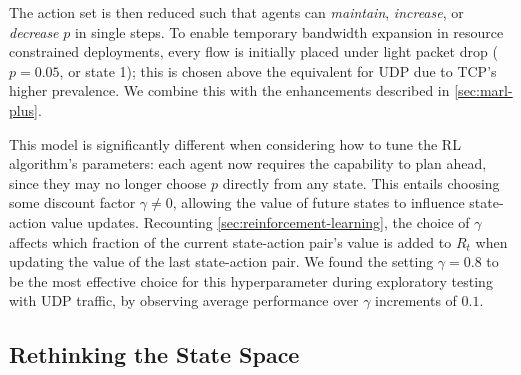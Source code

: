 \documentclass[conference, a4paper, 10pt, times]{IEEEtran}
\begin{document}
The action set is then reduced such that agents can \emph{maintain}, \emph{increase}, or \emph{decrease} $p$ in single steps.
To enable temporary bandwidth expansion in resource constrained deployments, every flow is initially placed under light packet drop ($p=0.05$, or state 1); this is chosen above the equivalent for UDP due to TCP's higher prevalence.
We combine this with the enhancements described in \cref{sec:marl-plus}.

This model is significantly different when considering how to tune the RL algorithm's parameters: each agent now requires the capability to plan ahead, since they may no longer choose $p$ directly from any state.
This entails choosing some discount factor $\gamma \ne 0$, allowing the value of future states to influence state-action value updates.
Recounting \cref{sec:reinforcement-learning}, the choice of $\gamma$ affects which fraction of the current state-action pair's value is added to $R_t$ when updating the value of the last state-action pair.
We found the setting $\gamma = 0.8$ to be the most effective choice for this hyperparameter during exploratory testing with UDP traffic, by observing average performance over $\gamma$ increments of $0.1$.

\subsection{Rethinking the State Space}\label{sec:rethinking-the-state-space}
\end{document}
